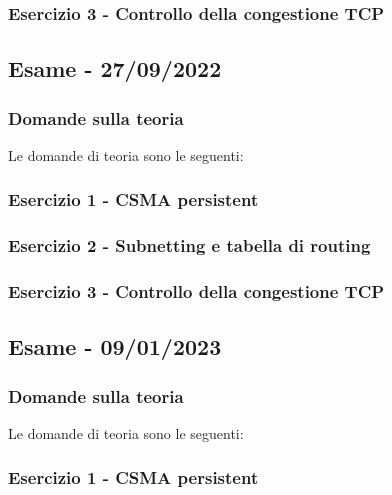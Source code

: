 \documentclass[a4paper]{article}
\begin{document}
	\subsubsection{Esercizio 3 - Controllo della congestione TCP}
	
	\newpage

	\subsection[\textbf{Esame - 27/09/2022}]{Esame - 27/09/2022}
	
	\subsubsection{Domande sulla teoria}
	Le domande di teoria sono le seguenti:
	
	\subsubsection{Esercizio 1 - CSMA persistent}
	
	\subsubsection{Esercizio 2 - Subnetting e tabella di routing}
	
	\subsubsection{Esercizio 3 - Controllo della congestione TCP}
	
	\newpage

	\subsection[\textbf{Esame - 09/01/2023}]{Esame - 09/01/2023}
	
	\subsubsection{Domande sulla teoria}
	Le domande di teoria sono le seguenti:
	
	\subsubsection{Esercizio 1 - CSMA persistent}
	
\end{document}
